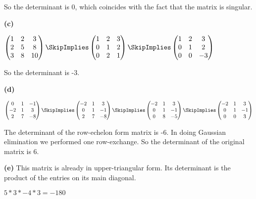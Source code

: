 \documentclass[oneside,12pt]{amsart}
\begin{document}
\bigskip

So the determinant is 0, which coincides with the fact that the matrix is singular.

\textbf{(c)}

\bigskip

$
\begin{pmatrix}
1 & 2 & 3 \\
2 & 5 & 8 \\
3 & 8 & 10
\end{pmatrix}
\SkipImplies
\begin{pmatrix}
1 & 2 & 3 \\
0 & 1 & 2 \\
0 & 2 & 1
\end{pmatrix}
\SkipImplies
\begin{pmatrix}
1 & 2 & 3 \\
0 & 1 & 2 \\
0 & 0 & -3
\end{pmatrix}
$

\bigskip

So the determinant is -3.

\bigskip

\textbf{(d)}

\bigskip

$
\begin{pmatrix}
0 & 1 & -1 \\
-2 & 1 & 3 \\
2 & 7 & -8
\end{pmatrix}
\SkipImplies
\begin{pmatrix}
-2 & 1 & 3 \\
0 & 1 & -1 \\
2 & 7 & -8
\end{pmatrix}
\SkipImplies
\begin{pmatrix}
-2 & 1 & 3 \\
0 & 1 & -1 \\
0 & 8 & -5
\end{pmatrix}
\SkipImplies
\begin{pmatrix}
-2 & 1 & 3 \\
0 & 1 & -1 \\
0 & 0 & 3
\end{pmatrix}
$

\bigskip

The determinant of the row-echelon form matrix is -6. In doing Gaussian elimination
we performed one row-exchange. So the determinant of the original matrix is 6.

\bigskip

\textbf{(e)} This matrix is already in upper-triangular form. Its determinant
is the product of the entries on its main diagonal.

$5*3*-4*3 = -180$
\end{document}
